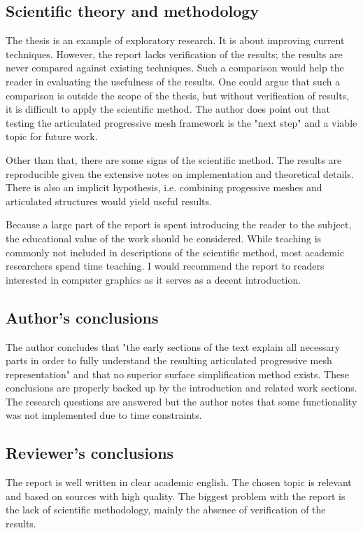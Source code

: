 \documentclass{article}
\begin{document}
\subsection{Scientific theory and methodology}

The thesis is an example of exploratory research. It is about improving current
techniques. However, the report lacks verification of the results; the results
are never compared against existing techniques. Such a comparison would help the
reader in evaluating the usefulness of the results. One could argue that such a
comparison is outside the scope of the thesis, but without verification of
results, it is difficult to apply the scientific method. The author does point
out that testing the articulated progressive mesh framework is the "next step"
and a viable topic for future work.

Other than that, there are some signs of the scientific method. The results are
reproducible given the extensive notes on implementation and theoretical
details. There is also an implicit hypothesis, i.e. combining progessive meshes
and articulated structures would yield useful results.

Because a large part of the report is spent introducing the reader to the
subject, the educational value of the work should be considered. While teaching
is commonly not included in descriptions of the scientific method, most academic
researchers spend time teaching. I would recommend the report to readers
interested in computer graphics as it serves as a decent introduction.

\subsection{Author's conclusions}

The author concludes that "the early sections of the text explain all necessary
parts in order to fully understand the resulting articulated progressive mesh
representation" and that no superior surface simplification method exists. These
conclusions are properly backed up by the introduction and related work
sections. The research questions are answered but the author notes that some
functionality was not implemented due to time constraints.

\subsection{Reviewer's conclusions}

The report is well written in clear academic english. The chosen topic is
relevant and based on sources with high quality. The biggest problem with the
report is the lack of scientific methodology, mainly the absence of verification
of the results.


\end{document}
